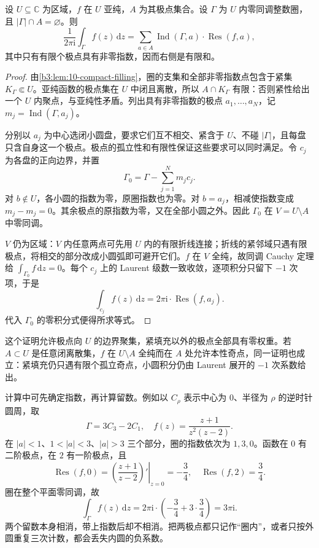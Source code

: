 \begin{theorem}[一般留数公式]\label{b3:thm:10-residue-general}
设 \(U\subseteq\mathbb C\) 为区域，\(f\) 在 \(U\) 亚纯，\(A\) 为其极点集合。设 \(\Gamma\) 为 \(U\) 内零同调整数圈，且 \(|\Gamma|\cap A=\varnothing\)。则
\[
 \frac1{2\pi\mathrm i}\int_\Gamma f(z)\,\mathrm dz
 =\sum_{a\in A}\operatorname{Ind}(\Gamma,a)\cdot\operatorname{Res}(f,a),
\]
其中只有有限个极点具有非零指数，因而右侧是有限和。
\end{theorem}
\begin{proof}
由\cref{b3:lem:10-compact-filling}，圈的支集和全部非零指数点包含于紧集 \(K_\Gamma\Subset U\)。亚纯函数的极点集在 \(U\) 中闭且离散，所以 \(A\cap K_\Gamma\) 有限：否则紧性给出一个 \(U\) 内聚点，与亚纯性矛盾。列出具有非零指数的极点 \(a_1,\ldots,a_N\)，记 \(m_j=\operatorname{Ind}(\Gamma,a_j)\)。

分别以 \(a_j\) 为中心选闭小圆盘，要求它们互不相交、紧含于 \(U\)、不碰 \(|\Gamma|\)，且每盘只含自身这一个极点。极点的孤立性和有限性保证这些要求可以同时满足。令 \(c_j\) 为各盘的正向边界，并置
\[
 \Gamma_0=\Gamma-\sum_{j=1}^N m_jc_j.
\]
对 \(b\notin U\)，各小圆的指数为零，原圈指数也为零。对 \(b=a_j\)，相减使指数变成 \(m_j-m_j=0\)。其余极点的原指数为零，又在全部小圆之外。因此 \(\Gamma_0\) 在 \(V=U\setminus A\) 中零同调。

\(V\) 仍为区域：\(V\) 内任意两点可先用 \(U\) 内的有限折线连接；折线的紧邻域只遇有限极点，将相交的部分改成小圆弧即可避开它们。\(f\) 在 \(V\) 全纯，故同调 Cauchy 定理给 \(\int_{\Gamma_0}f\,\mathrm dz=0\)。每个 \(c_j\) 上的 Laurent 级数一致收敛，逐项积分只留下 \(-1\) 次项，于是
\[
 \int_{c_j}f(z)\,\mathrm dz
 =2\pi\mathrm i\cdot\operatorname{Res}(f,a_j).
\]
代入 \(\Gamma_0\) 的零积分式便得所求等式。
\end{proof}

这个证明允许极点向 \(U\) 的边界聚集，紧填充以外的极点全部具有零权重。若 \(A\subset U\) 是任意闭离散集，\(f\) 在 \(U\setminus A\) 全纯而在 \(A\) 处允许本性奇点，同一证明也成立：紧填充仍只遇有限个孤立奇点，小圆积分仍由 Laurent 展开的 \(-1\) 次系数给出。

\ProseParagraphBreak
计算中可先确定指数，再计算留数。例如以 \(C_\rho\) 表示中心为 \(0\)、半径为 \(\rho\) 的逆时针圆周，取
\[
 \Gamma=3C_3-2C_1,\quad
 f(z)=\frac{z+1}{z^2(z-2)}.
\]
在 \(|a|<1\)、\(1<|a|<3\)、\(|a|>3\) 三个部分，圈的指数依次为 \(1,3,0\)。函数在 \(0\) 有二阶极点，在 \(2\) 有一阶极点，且
\[
 \operatorname{Res}(f,0)
 =\left.\left(\frac{z+1}{z-2}\right)'\right|_{z=0}
 =-\frac34,\quad
 \operatorname{Res}(f,2)=\frac34.
\]
圈在整个平面零同调，故
\[
 \int_\Gamma f(z)\,\mathrm dz
 =2\pi\mathrm i\cdot\left(-\frac34+3\cdot\frac34\right)
 =3\pi\mathrm i.
\]
两个留数本身相消，带上指数后却不相消。把两极点都只记作“圈内”，或者只按外圆重复三次计数，都会丢失内圆的负系数。

